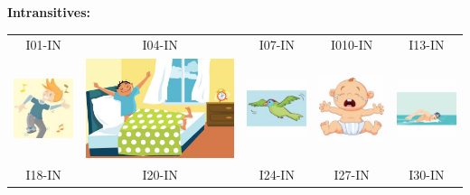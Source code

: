 \documentclass[12pt,notitlepage]{article}
\begin{document}
\begin{center}
\textbf{Intransitives:}

\begin{tabular}{|c||c||c||c||c|}

\hline

I01-IN & I04-IN & I07-IN & I010-IN & I13-IN \\
\includegraphics[width=0.13\columnwidth]{square/I01.jpg} & \includegraphics[width=0.13\columnwidth]{figures/I04.jpg} &  \includegraphics[width=0.13\columnwidth]{square/I07.jpg} &  \includegraphics[width=0.13\columnwidth]{square/I10.jpg} & \includegraphics[width=0.13\columnwidth]{square/I13.jpg} \\
\hline
\hline
I18-IN & I20-IN & I24-IN & I27-IN & I30-IN \\

\end{tabular}
\end{center}
\end{document}

